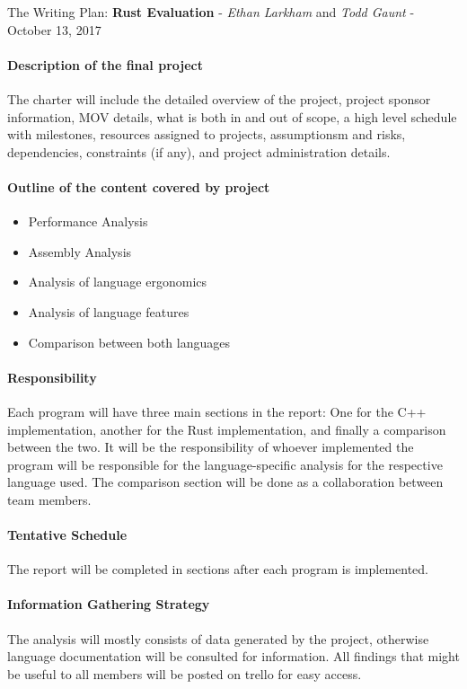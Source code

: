 \documentclass[10pt,a4paper]{report}
\begin{document}
\begin{center}
	{\Large The Writing Plan: {\bfseries Rust Evaluation}}
	- {\large{\itshape Ethan Larkham} and {\itshape Todd Gaunt}}
	- {\large October 13, 2017}
\end{center}
\vspace{0.5em}
\paragraph{Description of the final project}
The charter will include the detailed overview of the project, project sponsor
information, MOV details, what is both in and out of scope, a high level
schedule with milestones, resources assigned to projects, assumptionsm and
risks, dependencies, constraints (if any), and project administration details.
\paragraph{Outline of the content covered by project}
\begin{flushleft}
	\begin{itemize}
		\item Performance Analysis
		\item Assembly Analysis
		\item Analysis of language ergonomics
		\item Analysis of language features
		\item Comparison between both languages
	\end{itemize}
\end{flushleft}
\paragraph{Responsibility}
Each program will have three main sections in the report: One for the C++
implementation, another for the Rust implementation, and finally a comparison
between the two. It will be the responsibility of whoever implemented the
program will be responsible for the language-specific analysis for the
respective language used. The comparison section will be done as a
collaboration between team members.
\paragraph{Tentative Schedule}
The report will be completed in sections after each program is implemented.
\paragraph{Information Gathering Strategy}
The analysis will mostly consists of data generated by the project, otherwise
language documentation will be consulted for information. All findings that
might be useful to all members will be posted on trello for easy access.
\end{document}
